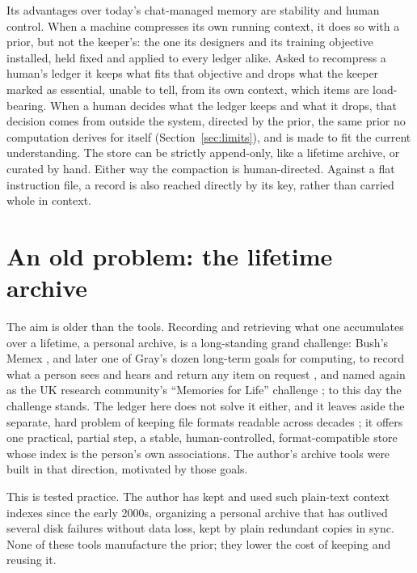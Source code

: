 \documentclass[11pt]{article}
\begin{document}
Its advantages over today's chat-managed memory are stability and human control. When a machine
compresses its own running context, it does so with a prior, but not the keeper's: the one its
designers and its training objective installed, held fixed and applied to every ledger alike. Asked
to recompress a human's ledger it keeps what fits that objective and drops what the keeper marked as
essential, unable to tell, from its own context, which items are load-bearing.
When a human decides what the ledger keeps and what it drops, that decision comes from outside the system,
directed by the prior, the same prior no computation derives for itself (Section~\ref{sec:limits}),
and is made to fit the current understanding. The store can be strictly
append-only, like a lifetime archive, or curated by hand. Either way the compaction is human-directed.
Against a flat instruction file, a record is also reached directly by its key, rather than carried
whole in context.

\section{An old problem: the lifetime archive}
\label{sec:archive}
The aim is older than the tools. Recording and retrieving what one accumulates over a lifetime, a
personal archive, is a long-standing grand challenge: Bush's Memex \cite{bush1945}, and later one of
Gray's dozen long-term goals for computing, to record what a person sees and hears and return any
item on request \cite{gray2003}, and named again as the UK research community's ``Memories for Life'' challenge \cite{ohara2006}; to this day the challenge stands. The ledger here does not solve it either, and it leaves aside the
separate, hard problem of keeping file formats readable across decades \cite{rothenberg1995}; it offers one practical,
partial step, a stable, human-controlled, format-compatible store whose index is the person's own
associations. The author's archive tools were built in that direction, motivated by those goals.

This is tested practice. The author has kept and used such plain-text context indexes since the early
2000s, organizing a personal archive that has outlived several disk failures without data loss, kept
by plain redundant copies in sync. None of these tools manufacture the prior; they lower the cost of
keeping and reusing it.
\end{document}
